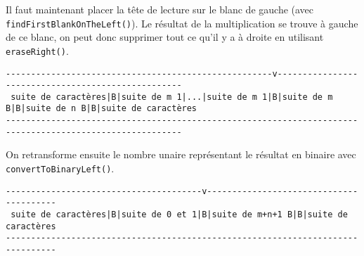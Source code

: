 \documentclass[a4paper,11pt]{article}
\begin{document}
Il faut maintenant placer la tête de lecture sur le blanc de gauche (avec \texttt{findFirstBlankOnTheLeft()}). Le résultat de la multiplication se trouve à gauche de ce blanc, on peut donc supprimer tout ce qu'il y a à droite en utilisant \texttt{eraseRight()}.
\begin{footnotesize}
\begin{verbatim}
-----------------------------------------------------v---------------------------------------------------
 suite de caractères|B|suite de m 1|...|suite de m 1|B|suite de m B|B|suite de n B|B|suite de caractères
---------------------------------------------------------------------------------------------------------
\end{verbatim}
\end{footnotesize}
On retransforme ensuite le nombre unaire représentant le résultat en binaire avec \texttt{convertToBinaryLeft()}.
\begin{verbatim}
---------------------------------------v----------------------------------------
 suite de caractères|B|suite de 0 et 1|B|suite de m+n+1 B|B|suite de caractères
--------------------------------------------------------------------------------
\end{verbatim}
\end{document}
